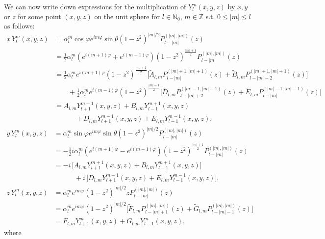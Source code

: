 \documentclass[11pt, oneside]{article}   	%
\newcommand{\half}{\frac{1}{2}}
\newcommand{\Z}{\mathbb{Z}}
\newcommand{\No}{\mathbb{N}_0}
\newcommand{\Ylm}{Y^m_l}
\newcommand{\sintheta}{\sin\theta}
\newcommand{\cosphi}{\cos\varphi}
\newcommand{\sinphi}{\sin\varphi}
\newcommand{\eimphi}{e^{im\varphi}}
\newcommand{\alphalm}{\alpha^m_l}
\newcommand{\Atilde}{\tilde{A}_{l,m}}
\newcommand{\Btilde}{\tilde{B}_{l,m}}
\newcommand{\Dtilde}{\tilde{D}_{l,m}}
\newcommand{\Etilde}{\tilde{E}_{l,m}}
\newcommand{\Ftilde}{\tilde{F}_{l,m}}
\newcommand{\Gtilde}{\tilde{G}_{l,m}}
\newcommand{\Alm}{A_{l,m}}
\newcommand{\Blm}{B_{l,m}}
\newcommand{\Dlm}{D_{l,m}}
\newcommand{\Elm}{E_{l,m}}
\newcommand{\Flm}{F_{l,m}}
\newcommand{\Glm}{G_{l,m}}
\begin{document}
We can now write down expressions for the multiplication of \(\Ylm(x,y,z)\) by \(x, y \) or \(z\) for some point \((x,y,z)\) on the unit sphere for \(l \in \No\), \(m \in \Z\) s.t. \(0 \le |m| \le l\) as follows:
\begin{align}
x\,\Ylm(x,y,z) &= \alphalm \cosphi \eimphi \sintheta (1-z^2)^{|m|/2} P^{(|m|,|m|)}_{l-|m|}(z) \nonumber \\
		     &= \half \alphalm (e^{i(m+1)\varphi} + e^{i(m-1)\varphi}) (1-z^2)^{\frac{|m|+1}{2}} P^{(|m|,|m|)}_{l-|m|}(z) \nonumber \\
		     &= \half \alphalm e^{i(m+1)\varphi} (1-z^2)^{\frac{|m|+1}{2}} \big[ \Atilde P^{(|m|+1,|m|+1)}_{l-|m|}(z) + \Btilde P^{(|m|+1,|m|+1)}_{l-|m|-2}(z) \big] \nonumber \\
		     &\quad \quad +  \half \alphalm e^{i(m-1)\varphi} (1-z^2)^{\frac{|m|-1}{2}} \big[ \Dtilde P^{(|m|-1,|m|-1)}_{l-|m|+2}(z) + \Etilde P^{(|m|-1,|m|-1)}_{l-|m|}(z) \big] \nonumber \\
		     &= \Alm Y^{m+1}_{l+1}(x,y,z) +  \Blm Y^{m+1}_{l-1}(x,y,z) \nonumber \\
		     & \quad \quad \quad + \Dlm Y^{m-1}_{l+1}(x,y,z) + \Elm Y^{m-1}_{l-1}(x,y,z),
\end{align}
\begin{align}
y\,\Ylm(x,y,z) &= \alphalm \sinphi \eimphi \sintheta (1-z^2)^{|m|/2} P^{(|m|,|m|)}_{l-|m|}(z) \nonumber \\
		     &= -\half i \alphalm (e^{i(m+1)\varphi} - e^{i(m-1)\varphi}) (1-z^2)^{\frac{|m|+1}{2}} P^{(|m|,|m|)}_{l-|m|}(z) \nonumber \\
		     &= - i \, \big[\Alm Y^{m+1}_{l+1}(x,y,z) +  \Blm Y^{m+1}_{l-1}(x,y,z) \big] \nonumber \\
		     &\quad \quad \quad + i \, \big[ \Dlm Y^{m-1}_{l+1}(x,y,z) + \Elm Y^{m-1}_{l-1}(x,y,z) \big],
\end{align}
\begin{align}
z\,\Ylm(x,y,z) &= \alphalm \eimphi (1-z^2)^{|m|/2} z P^{(|m|,|m|)}_{l-|m|}(z) \nonumber \\
		     &= \alphalm \eimphi (1-z^2)^{|m|/2} \big[ \Ftilde P^{(|m|,|m|)}_{l-|m|+1}(z) + \Gtilde P^{(|m|,|m|)}_{l-|m|-1}(z) \big]\nonumber \\
		     &= \Flm Y^{m}_{l+1}(x,y,z) + \Glm Y^{m}_{l-1}(x,y,z) ,
\end{align}
where
\end{document}
